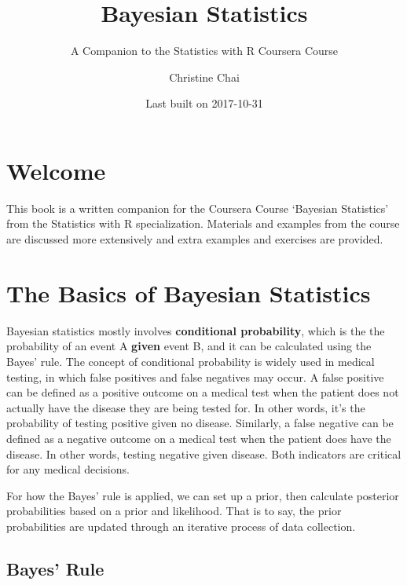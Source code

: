 \documentclass[]{book}
\title{Bayesian Statistics}
\subtitle{A Companion to the Statistics with R Coursera Course}
\author{Christine Chai}
\date{Last built on 2017-10-31}
\theoremstyle{definition}
\theoremstyle{definition}
\theoremstyle{definition}
\theoremstyle{remark}
\begin{document}
\maketitle

{
\setcounter{tocdepth}{1}
\tableofcontents
}
\chapter*{Welcome}\label{welcome}

\newcommand{\No}{\textsf{N}}
\newcommand{\Ga}{\textsf{Gamma}}
\newcommand{\St}{\textsf{t}}
\newcommand{\NoGa}{\textsf{NormalGamma}}
\newcommand{\BF}{\textsf{BF}}
\newcommand{\data}{\text{data}}
\newcommand{\iid}{\mathrel{\mathop{\sim}\limits^{\rm iid}}}


This book is a written companion for the Coursera Course `Bayesian
Statistics' from the Statistics with R specialization. Materials and
examples from the course are discussed more extensively and extra
examples and exercises are provided.

\chapter{The Basics of Bayesian
Statistics}\label{the-basics-of-bayesian-statistics}

Bayesian statistics mostly involves \textbf{conditional probability},
which is the the probability of an event A \textbf{given} event B, and
it can be calculated using the Bayes' rule. The concept of conditional
probability is widely used in medical testing, in which false positives
and false negatives may occur. A false positive can be defined as a
positive outcome on a medical test when the patient does not actually
have the disease they are being tested for. In other words, it's the
probability of testing positive given no disease. Similarly, a false
negative can be defined as a negative outcome on a medical test when the
patient does have the disease. In other words, testing negative given
disease. Both indicators are critical for any medical decisions.

For how the Bayes' rule is applied, we can set up a prior, then
calculate posterior probabilities based on a prior and likelihood. That
is to say, the prior probabilities are updated through an iterative
process of data collection.

\section{Bayes' Rule}\label{bayes-rule}
\end{document}
